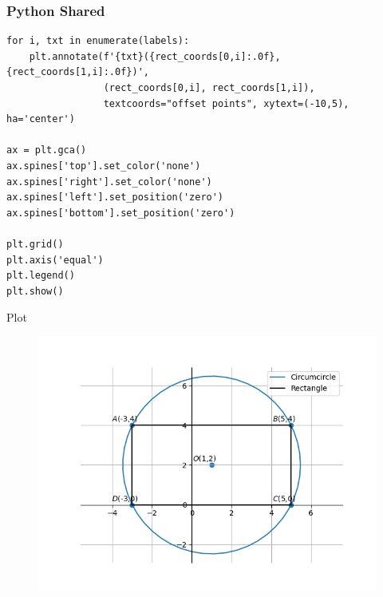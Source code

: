 \documentclass{beamer}
\begin{document}
\begin{frame}[fragile]
\frametitle{Python Shared}
\begin{lstlisting}
for i, txt in enumerate(labels):
    plt.annotate(f'{txt}({rect_coords[0,i]:.0f},{rect_coords[1,i]:.0f})',
                 (rect_coords[0,i], rect_coords[1,i]),
                 textcoords="offset points", xytext=(-10,5), ha='center')

ax = plt.gca()
ax.spines['top'].set_color('none')
ax.spines['right'].set_color('none')
ax.spines['left'].set_position('zero')
ax.spines['bottom'].set_position('zero')

plt.grid()
plt.axis('equal')
plt.legend()
plt.show()

\end{lstlisting}
\end{frame}
\begin{frame}{Plot}
\begin{figure}
    \centering
    \includegraphics[width=0.75\linewidth]{figs/fig1.png}
    \caption{}
    \label{fig:placeholder}
\end{figure}
    
\end{frame}
\end{document}
